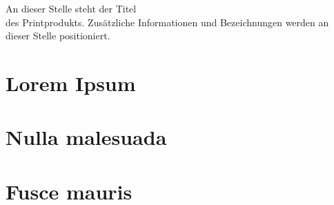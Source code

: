 \documentclass[11pt, a4paper]{article}
\begin{document}
  {An dieser Stelle steht der Titel \\ des Printprodukts.} %
  {Zusätzliche Informationen und Bezeichnungen werden an dieser Stelle positioniert.} %

\newpage
\section{Lorem Ipsum}
\lipsum[1-2]
\section{Nulla malesuada}
\lipsum[3-4]
\section{Fusce mauris}
\lipsum[5-6]
\end{document}
